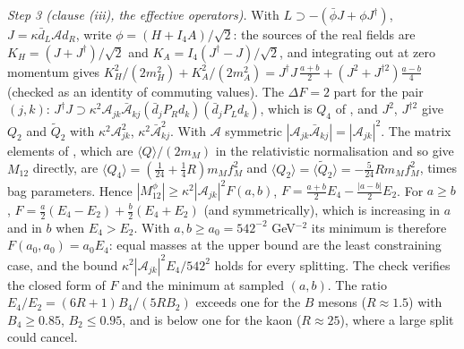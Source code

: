 \emph{Step 3 (clause (iii), the effective operators).} With $L \supset -(\bar\phi J + \phi J^{\dagger})$, $J = \kappa\bar{d}_{L}\mathcal{A}d_{R}$, write $\phi = (H + I_{4}A)/\sqrt2$: the sources of the real fields are $K_{H} = (J + J^{\dagger})/\sqrt2$ and $K_{A} = I_{4}(J^{\dagger} - J)/\sqrt2$, and integrating out at zero momentum gives $K_{H}^{2}/(2m_{H}^{2}) + K_{A}^{2}/(2m_{A}^{2}) = J^{\dagger}J\,\tfrac{a + b}{2} + (J^{2} + J^{\dagger 2})\tfrac{a - b}{4}$ (checked as an identity of commuting values). The $\Delta F = 2$ part for the pair $(j, k)$: $J^{\dagger}J \supset \kappa^{2}\mathcal{A}_{jk}\bar{\mathcal{A}}_{kj}(\bar{d}_{j}P_{R}d_{k})(\bar{d}_{j}P_{L}d_{k})$, which is $Q_{4}$ of \cite[Eq.~(3)]{Gabbiani1996}, and $J^{2}$, $J^{\dagger 2}$ give $Q_{2}$ and $\tilde{Q}_{2}$ with $\kappa^{2}\mathcal{A}_{jk}^{2}$, $\kappa^{2}\bar{\mathcal{A}}_{kj}^{2}$. With $\mathcal{A}$ symmetric $|\mathcal{A}_{jk}\bar{\mathcal{A}}_{kj}| = |\mathcal{A}_{jk}|^{2}$. The matrix elements of \cite[Eq.~(8)]{Gabbiani1996}, which are $\langle Q\rangle/(2m_{M})$ in the relativistic normalisation and so give $M_{12}$ directly, are $\langle Q_{4}\rangle = (\tfrac{1}{24} + \tfrac14R)m_{M}f_{M}^{2}$ and $\langle Q_{2}\rangle = \langle\tilde{Q}_{2}\rangle = -\tfrac{5}{24}Rm_{M}f_{M}^{2}$, times bag parameters. Hence $|M_{12}^{\phi}| \ge \kappa^{2}|\mathcal{A}_{jk}|^{2}F(a, b)$, $F = \tfrac{a + b}{2}E_{4} - \tfrac{|a - b|}{2}E_{2}$. For $a \ge b$, $F = \tfrac{a}{2}(E_{4} - E_{2}) + \tfrac{b}{2}(E_{4} + E_{2})$ (and symmetrically), which is increasing in $a$ and in $b$ when $E_{4} > E_{2}$. With $a, b \ge a_{0} = 542^{-2}$ GeV$^{-2}$ its minimum is therefore $F(a_{0}, a_{0}) = a_{0}E_{4}$: equal masses at the upper bound are the least constraining case, and the bound $\kappa^{2}|\mathcal{A}_{jk}|^{2}E_{4}/542^{2}$ holds for every splitting. The check verifies the closed form of $F$ and the minimum at sampled $(a, b)$. The ratio $E_{4}/E_{2} = (6R + 1)B_{4}/(5RB_{2})$ exceeds one for the $B$ mesons ($R \approx 1.5$) with $B_{4} \ge 0.85$, $B_{2} \le 0.95$, and is below one for the kaon ($R \approx 25$), where a large split could cancel.

